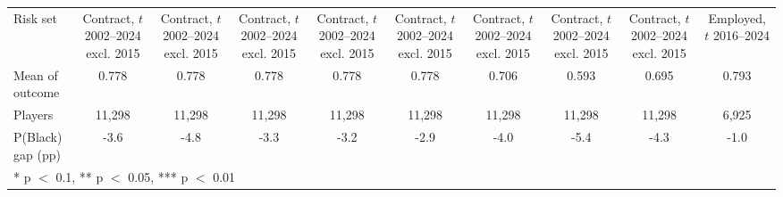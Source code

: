 \begin{table}[H]
{\begin{tabular}[t]{lccccccccc}
Risk set & \shortstack{Contract, $t$\\2002--2024\\excl. 2015} & \shortstack{Contract, $t$\\2002--2024\\excl. 2015} & \shortstack{Contract, $t$\\2002--2024\\excl. 2015} & \shortstack{Contract, $t$\\2002--2024\\excl. 2015} & \shortstack{Contract, $t$\\2002--2024\\excl. 2015} & \shortstack{Contract, $t$\\2002--2024\\excl. 2015} & \shortstack{Contract, $t$\\2002--2024\\excl. 2015} & \shortstack{Contract, $t$\\2002--2024\\excl. 2015} & \shortstack{Employed, $t$\\2016--2024}\\
Mean of outcome & 0.778 & 0.778 & 0.778 & 0.778 & 0.778 & 0.706 & 0.593 & 0.695 & 0.793\\
Players & 11,298 & 11,298 & 11,298 & 11,298 & 11,298 & 11,298 & 11,298 & 11,298 & 6,925\\
P(Black) gap (pp) & -3.6 & -4.8 & -3.3 & -3.2 & -2.9 & -4.0 & -5.4 & -4.3 & -1.0\\
\bottomrule
\multicolumn{10}{l}{\rule{0pt}{1em}* p $<$ 0.1, ** p $<$ 0.05, *** p $<$ 0.01}\\
\end{tabular}}
\end{table}

